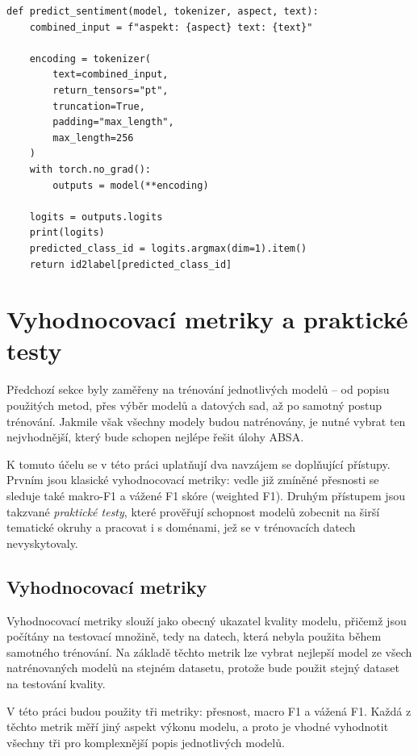\begin{listing}[ht]
\begin{verbatim}
def predict_sentiment(model, tokenizer, aspect, text):
    combined_input = f"aspekt: {aspect} text: {text}"

    encoding = tokenizer(
        text=combined_input,
        return_tensors="pt",
        truncation=True,
        padding="max_length",
        max_length=256
    )
    with torch.no_grad():
        outputs = model(**encoding)

    logits = outputs.logits
    print(logits)
    predicted_class_id = logits.argmax(dim=1).item()
    return id2label[predicted_class_id]
\end{verbatim}
\caption[Ukázka funkce na predikci sentimentu]%
{Ukázka funkce na predikci sentimentu, vlastní práce}
\label{code:prediction}
\end{listing}

\section{Vyhodnocovací metriky a praktické testy}
Předchozí sekce byly zaměřeny na trénování jednotlivých modelů -- od popisu použitých metod, přes výběr modelů a datových sad, až po samotný postup trénování. Jakmile však všechny modely budou natrénovány, je nutné vybrat ten nejvhodnější, který bude schopen nejlépe řešit úlohy ABSA.

K tomuto účelu se v této práci uplatňují dva navzájem se doplňující přístupy. Prvním jsou klasické vyhodnocovací metriky: vedle již zmíněné přesnosti se sleduje také makro-F1 a vážené F1 skóre (weighted F1). Druhým přístupem jsou takzvané \emph{praktické testy}, které prověřují schopnost modelů zobecnit na širší tematické okruhy a pracovat i s doménami, jež se v trénovacích datech nevyskytovaly.

\subsection{Vyhodnocovací metriky}\label{metriky}
Vyhodnocovací metriky slouží jako obecný ukazatel kvality modelu, přičemž jsou počítány na testovací množině, tedy na datech, která nebyla použita během samotného trénování. Na základě těchto metrik lze vybrat nejlepší model ze všech natrénovaných modelů na stejném datasetu, protože bude použit stejný dataset na testování kvality.

V této práci budou použity tři metriky: přesnost, macro F1 a vážená F1. Každá z těchto metrik měří jiný aspekt výkonu modelu, a proto je vhodné vyhodnotit všechny tři pro komplexnější popis jednotlivých modelů.


